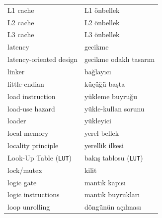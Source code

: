 {\begin{longtable}{@{}p{7.6cm}p{7.6cm}@{}}
L1 cache & L1 önbellek \\
L2 cache & L2 önbellek \\
L3 cache & L3 önbellek \\
latency & gecikme \\
latency-oriented design & gecikme odaklı tasarım \\
linker & bağlayıcı \\
little-endian & küçüğü başta \\
load instruction & yükleme buyruğu \\
load-use hazard & yükle-kullan sorunu \\
loader & yükleyici \\
local memory & yerel bellek \\
locality principle & yerellik ilkesi \\
Look-Up Table (\texttt{LUT}) & bakış tablosu (\texttt{LUT}) \\
lock/mutex & kilit \\
logic gate & mantık kapısı \\
logic instructions & mantık buyrukları \\
loop unrolling & döngünün açılması \\


\end{longtable}}
